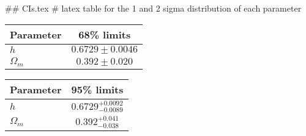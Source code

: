 ## CIs.tex
# latex table for the 1 and 2 sigma distribution of each parameter

\begin{tabular} { l  c}
 Parameter &  68\% limits\\
\hline
{\boldmath$h              $} & $0.6729\pm 0.0046          $\\
{\boldmath$\Omega_m       $} & $0.392\pm 0.020            $\\
\hline
\end{tabular}

\begin{tabular} { l  c}
 Parameter &  95\% limits\\
\hline
{\boldmath$h              $} & $0.6729^{+0.0092}_{-0.0089}$\\
{\boldmath$\Omega_m       $} & $0.392^{+0.041}_{-0.038}   $\\
\hline
\end{tabular}
